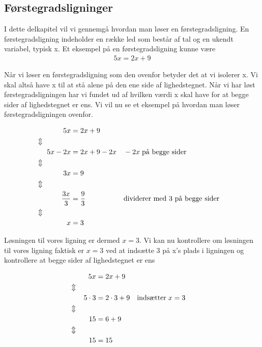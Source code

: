 \subsection{Førstegradsligninger}

I dette delkapitel vil vi gennemgå hvordan man løser en førstegradsligning. En førstegradsligning indeholder en række led som består af tal og en ukendt variabel, typisk x. Et eksempel på en førstegradsligning kunne være 
\begin{align*}
    5x = 2x + 9
\end{align*}

Når vi løser en førstegradsligning som den ovenfor betyder det at vi isolerer x. Vi skal altså have x til at stå alene på den ene side af lighedstegnet. Når vi har løst førstegradsligningen har vi fundet ud af hvilken værdi x skal have for at begge sider af lighedstegnet er ens. 
Vi vil nu se et eksempel på hvordan man løser førstegradsligningen ovenfor.

\begin{align*}
    5x &= 2x + 9\\
    \Updownarrow \hspace{1.4cm}&\\
    5x - 2x &= 2x + 9 - 2x && -2x \hspace{1mm} \text{på begge sider}\\
    \Updownarrow \hspace{1.4cm}&\\
    3x &= 9\\
    \Updownarrow \hspace{1.4cm}&\\
    \frac{3x}{3} &= \frac{9}{3} && \text{dividerer med 3 på begge sider}\\
    \Updownarrow \hspace{1.4cm}&\\
    x &= 3
\end{align*}

Løsningen til vores ligning er dermed $x = 3$. Vi kan nu kontrollere om løsningen til vores ligning faktisk er $x = 3$ ved at indsætte 3 på x's plads i ligningen og kontrollere at begge sider af lighedstegnet er ens

\begin{align*}
    5x &= 2x + 9\\
    \Updownarrow \hspace{1cm}&\\
    5\cdot 3 &= 2 \cdot 3 + 9 && \text{indsætter} \hspace{1mm} x = 3 \\
    \Updownarrow \hspace{1cm}&\\
    15 &= 6 + 9\\
    \Updownarrow \hspace{1cm}&\\
    15 &= 15
\end{align*}

